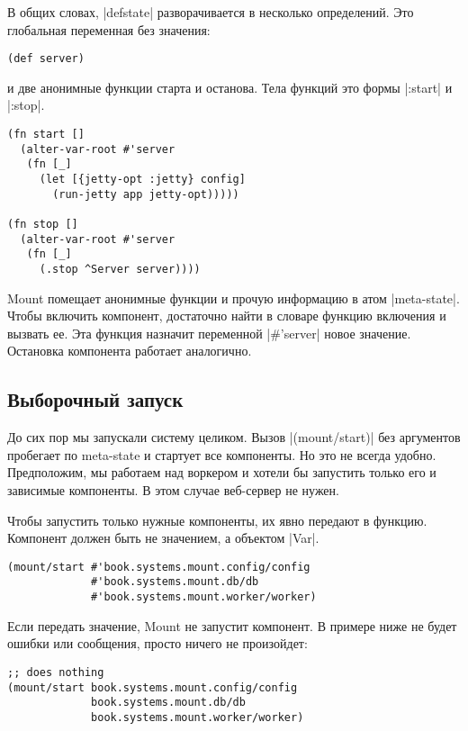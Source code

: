 В общих словах, \spverb|defstate| разворачивается в несколько определений. Это
глобальная переменная без значения:

\begin{verbatim}
(def server)
\end{verbatim}

и две анонимные функции старта и останова. Тела функций это формы \spverb|:start| и
\spverb|:stop|.

\begin{verbatim}
(fn start []
  (alter-var-root #'server
   (fn [_]
     (let [{jetty-opt :jetty} config]
       (run-jetty app jetty-opt)))))

(fn stop []
  (alter-var-root #'server
   (fn [_]
     (.stop ^Server server))))
\end{verbatim}

Mount помещает анонимные функции и прочую информацию в атом \spverb|meta-state|. Чтобы
включить компонент, достаточно найти в словаре функцию включения и вызвать
ее. Эта функция назначит переменной \spverb|#'server| новое значение. Остановка
компонента работает аналогично.

\subsection{Выборочный запуск}

До сих пор мы запускали систему целиком. Вызов \spverb|(mount/start)| без аргументов
пробегает по meta-state и стартует все компоненты. Но это не всегда
удобно. Предположим, мы работаем над воркером и хотели бы запустить только его и
зависимые компоненты. В этом случае веб-сервер не нужен.

Чтобы запустить только нужные компоненты, их явно передают в функцию. Компонент
должен быть не значением, а объектом \spverb|Var|.

\begin{verbatim}
(mount/start #'book.systems.mount.config/config
             #'book.systems.mount.db/db
             #'book.systems.mount.worker/worker)
\end{verbatim}

Если передать значение, Mount не запустит компонент. В примере ниже не будет
ошибки или сообщения, просто ничего не произойдет:

\begin{verbatim}
;; does nothing
(mount/start book.systems.mount.config/config
             book.systems.mount.db/db
             book.systems.mount.worker/worker)
\end{verbatim}

